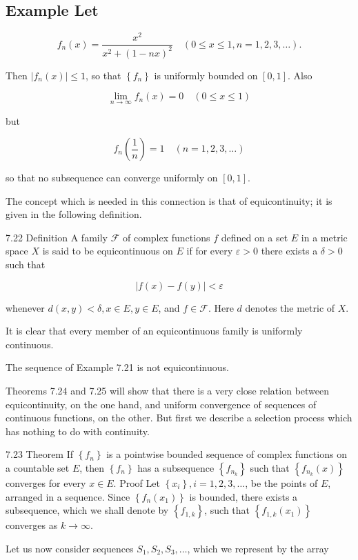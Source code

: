 \documentclass[10pt]{article}
\begin{document}
\subsection{Example Let}
$$
f_{n}(x)=\frac{x^{2}}{x^{2}+(1-n x)^{2}} \quad(0 \leq x \leq 1, n=1,2,3, \ldots) .
$$

Then $\left|f_{n}(x)\right| \leq 1$, so that $\left\{f_{n}\right\}$ is uniformly bounded on $[0,1]$. Also

$$
\lim _{n \rightarrow \infty} f_{n}(x)=0 \quad(0 \leq x \leq 1)
$$

but

$$
f_{n}\left(\frac{1}{n}\right)=1 \quad(n=1,2,3, \ldots)
$$

so that no subsequence can converge uniformly on $[0,1]$.

The concept which is needed in this connection is that of equicontinuity; it is given in the following definition.

7.22 Definition A family $\mathscr{F}$ of complex functions $f$ defined on a set $E$ in a metric space $X$ is said to be equicontinuous on $E$ if for every $\varepsilon>0$ there exists a $\delta>0$ such that

$$
|f(x)-f(y)|<\varepsilon
$$

whenever $d(x, y)<\delta, x \in E, y \in E$, and $f \in \mathscr{F}$. Here $d$ denotes the metric of $X$.

It is clear that every member of an equicontinuous family is uniformly continuous.

The sequence of Example 7.21 is not equicontinuous.

Theorems 7.24 and 7.25 will show that there is a very close relation between equicontinuity, on the one hand, and uniform convergence of sequences of continuous functions, on the other. But first we describe a selection process which has nothing to do with continuity.

7.23 Theorem If $\left\{f_{n}\right\}$ is a pointwise bounded sequence of complex functions on a countable set $E$, then $\left\{f_{n}\right\}$ has a subsequence $\left\{f_{n_{k}}\right\}$ such that $\left\{f_{n_{k}}(x)\right\}$ converges for every $x \in E$. Proof Let $\left\{x_{i}\right\}, i=1,2,3, \ldots$, be the points of $E$, arranged in a sequence. Since $\left\{f_{n}\left(x_{1}\right)\right\}$ is bounded, there exists a subsequence, which we shall denote by $\left\{f_{1, k}\right\}$, such that $\left\{f_{1, k}\left(x_{1}\right)\right\}$ converges as $k \rightarrow \infty$.

Let us now consider sequences $S_{1}, S_{2}, S_{3}, \ldots$, which we represent by the array
\end{document}
